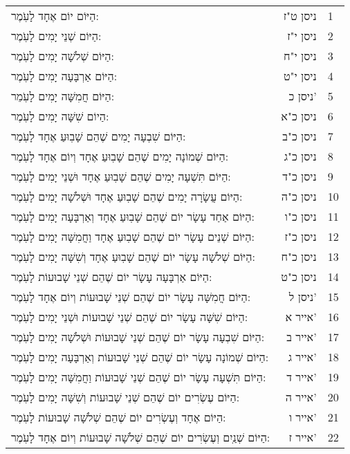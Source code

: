 \documentclass[twoside, openany, parskip=half, 11pt]{book}
\begin{document}
\begin{scriptsize}
\begin{longtable}{p{} | r | l}

 הַיּוֹם יוֹם אֶחָד לָעֹֽמֶר:& ניסן ט"ז& 1 \\
	הַיּוֹם שְׁנֵי יָמִים לָעֹֽמֶר:& ניסן י"ז& 2 \\
		הַיּוֹם שְׁלֹשָׁה יָמִים לָעֹֽמֶר:& ניסן י"ח& 3 \\
 	הַיּוֹם אַרְבָּעָה יָמִים לָעֹֽמֶר:& ניסן י"ט& 4 \\
	הַיּוֹם חֲמִשָּׁה יָמִים לָעֹֽמֵר:& ניסן כ'& 5 \\
הַיוֹם שִׁשָּׁה יָמִים לָעֹֽמֶר:& ניסן כ"א& 6 \\
	הַיּוֹם שִׁבְעָה יָמִים שֶׁהֵם שָׁבֽוּעַ אֶחָד לָעֹֽמֶר:&ניסן כ"ב & 7 \\
	הַיּוֹם שְׁמוֹנָה יָמִים שֶׁהֵם שָׁבֽוּעַ אֶחָד וְיוֹם אֶחָד לָעֹֽמֶר:&ניסן כ"ג & 8 \\
 	הַיּוֹם תִּשְׁעָה יָמִים שֶׁהֵם שָׁבֽוּעַ אֶחָד וּשְׁנֵי יָמִים לָעֹֽמֶר:&ניסן כ"ד & 9 \\
	הַיּוֹם עֲשָׂרָה יָמִים שֶׁהֵם שָׁבֽוּעַ אֶחָד וּשְׁלֹשָׁה יָמִים לָעֹֽמֶר:&ניסן כ"ה & 10 \\
 	הַיּוֹם אַחַד עָשָׂר יוֹם שֶׁהֵם שָׁבֽוּעַ אֶחָד וְאַרְבָּעָה יָמִים לָעֹֽמֶר:&ניסן כ"ו & 11 \\
 	הַיּוֹם שְׁנֵים עָשָׂר יוֹם שֶׁהֵם שָׁבֽוּעַ אֶחָד וַחֲמִשָּׁה יָמִים לָעֹֽמֶר:&ניסן כ"ז & 12 \\
 הַיּוֹם שְׁלֹשָׁה עָשָׂר יוֹם שֶׁהֵם שָׁבֽוּעַ אֶחָד וְשִׁשָּׁה יָמִים לָעֹֽמֶר:&ניסן כ"ח & 13 \\
 הַיּוֹם אַרְבָּעָה עָשָׂר יוֹם שֶׁהֵם שְׁנֵי שָׁבוּעוֹת לָעֹֽמֶר:& ניסן כ"ט & 14 \\
 	הַיּוֹם חֲמִשָּׁה עָשָׂר יוֹם שֶׁהֵם שְׁנֵי שָׁבוּעוֹת וְיוֹם אֶחָד לָעֹֽמֶר: &ניסן ל' & 15 \\
	הַיּוֹם שִׁשָּׁה עָשָׂר יוֹם שֶׁהֵם שְׁנֵי שָׁבוּעוֹת וּשְׁנֵי יָמִים לָעֹֽמֶר:&אייר א' & 16 \\
 	הַיּוֹם שִׁבְעָה עָשָׂר יוֹם שֶׁהֵם שְׁנֵי שָׁבוּעוֹת וּשְׁלֹשָׁה יָמִים לָעֹֽמֶר:&אייר ב' &17 \\
	הַיּוֹם שְׁמוֹנָה עָשָׂר יוֹם שֶׁהֵם שְׁנֵי שָׁבוּעוֹת וְאַרְבָּעָה יָמִים לָעֹֽמֶר:& אייר ג' & 18 \\
 	הַיּוֹם תִּשְׁעָה עָשָׂר יוֹם שֶׁהֵם שְׁנֵי שָׁבוּעוֹת וַחֲמִשָּׁה יָמִים לָעֹֽמֶר:&אייר ד' & 19 \\
 	הַיּוֹם עֶשְׂרִים יוֹם שֶׁהֵם שְׁנֵי שָׁבוּעוֹת וְשִׁשָּׁה יָמִים לָעֹֽמֶר:&אייר ה' & 20 \\
	הַיּוֹם אֶחָד וְעֶשְׂרִים יוֹם שֶׁהֵם שְׁלֹשָׁה שָׁבוּעוֹת לָעֹֽמֶר:&אייר ו' & 21 \\
	הַיּוֹם שְׁנַֽיִם וְעֶשְׂרִים יוֹם שֶׁהֵם שְׁלֹשָׁה שָׁבוּעוֹת וְיוֹם אֶחָד לָעֹֽמֶר:&אייר ז' & 22 \\

\end{longtable}
\end{scriptsize}
\end{document}
